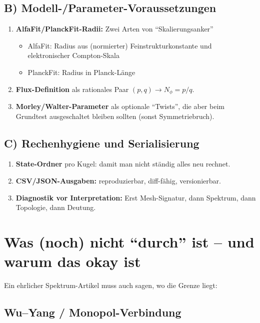 \documentclass[11pt,a4paper]{article}
\begin{document}
\subsection{B) Modell-/Parameter-Voraussetzungen}
\begin{enumerate}[leftmargin=*,itemsep=0.5em]
    \item \textbf{AlfaFit/PlanckFit-Radii:} Zwei Arten von ``Skalierungsanker''
    \begin{itemize}[leftmargin=*,itemsep=0.3em]
        \item AlfaFit: Radius aus (normierter) Feinstrukturkonstante und elektronischer Compton-Skala
        \item PlanckFit: Radius in Planck-Länge
    \end{itemize}
    \item \textbf{Flux-Definition} als rationales Paar $(p,q) \to N_\phi=p/q$.
    \item \textbf{Morley/Walter-Parameter} als optionale ``Twists'', die aber beim Grundtest ausgeschaltet bleiben sollten (sonst Symmetriebruch).
\end{enumerate}

\subsection{C) Rechenhygiene und Serialisierung}
\begin{enumerate}[leftmargin=*,itemsep=0.5em]
    \item \textbf{State-Ordner} pro Kugel: damit man nicht ständig alles neu rechnet.
    \item \textbf{CSV/JSON-Ausgaben:} reproduzierbar, diff-fähig, versionierbar.
    \item \textbf{Diagnostik vor Interpretation:} Erst Mesh-Signatur, dann Spektrum, dann Topologie, dann Deutung.
\end{enumerate}

\section{Was (noch) nicht ``durch'' ist -- und warum das okay ist}

Ein ehrlicher Spektrum-Artikel muss auch sagen, wo die Grenze liegt:

\subsection{Wu--Yang / Monopol-Verbindung}
\end{document}
